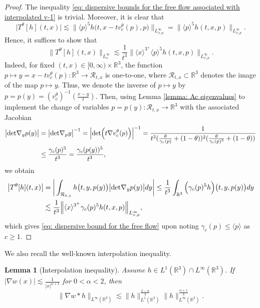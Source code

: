 \documentclass[reqno, 11pt, letterpaper]{amsart}
\newtheorem{lemma}[theorem]{Lemma}
\theoremstyle{remark}
\numberwithin{equation}{section}
\numberwithin{theorem}{section}
\numberwithin{table}{section}
\numberwithin{figure}{section}
\begin{document}
\begin{proof}
The inequality \eqref{eq: dispersive bounds for the free flow associated with interpolated v-1} is trivial. 
Moreover, it is clear that 
$$
\big|T^\theta[h](t,x)\big|\lesssim 
\Big\|\langle p\rangle^5 h \Big(t, x-tv_c^\theta(p),p\Big)\Big\|_{L_{x,p}^\infty}=\big\|\langle p\rangle^5 h(t, x,p)\big\|_{L_{x,p}^\infty}.$$
Hence, it suffices to show that 
\begin{equation}\label{eq: dispersive bound for the free flow}
\big\|T^\theta[h](t,x)\big\|_{L_x^\infty}\lesssim \frac{1}{t^3}\big\|\langle x\rangle^{3^+}\langle p\rangle^5h(t,x,p)\big\|_{L_{x,p}^\infty}.
\end{equation}
Indeed, for fixed $(t,x)\in [0,\infty)\times\mathbb{R}^3$, the function $p\mapsto y=x-tv_c^\theta(p):\mathbb{R}^3\to \mathcal{R}_{t,x}$ is one-to-one, where $\mathcal{R}_{t,x}\subset \mathbb{R}^3$ denotes the image of the map $p\mapsto y$. Thus, we denote the inverse of $p\mapsto y$ by $p=p(y)=(v_c^\theta)^{-1}(\frac{x-y}{t})$. Then, using Lemma \ref{lemma: Ac eigenvalues} to implement the change of variables $p=p(y): \mathcal{R}_{t,x}\to\mathbb{R}^3$ with the associated Jacobian 
$$\begin{aligned}
\big|\textup{det}\nabla_yp(y)\big|&=\big|\textup{det}\nabla_p y\big|^{-1}= \Big|\textup{det}\Big(t\nabla v_c^\theta(p)\Big)\Big|^{-1}=\frac{1}{t^3(\frac{\theta}{\gamma_c(p)}+(1-\theta))^2(\frac{\theta}{\gamma_c(p)^3}+(1-\theta))}\\
&\leq \frac{\gamma_c(p)^5}{t^3}=\frac{\gamma_c(p(y))^5}{t^3},
\end{aligned}$$
we obtain
$$\begin{aligned}
\big|T^\theta[h](t,x)\big| 
&=\bigg|\int_{\mathcal{R}_{t,x}} h \big(t,y, p(y)\big) \big|\textup{det}\nabla_y p(y)\big| dy\bigg|\leq\frac{1}{t^3}\int_{\mathbb{R}^3} \Big(\gamma_c(p)^5 h\Big)\big(t,y, p(y) \big) dy\\
&\lesssim\frac{1}{t^3}\Big\|\langle x\rangle^{3^+}\gamma_c(p)^5 h(t,x,p)\Big\|_{L_{x,p}^\infty},
\end{aligned}$$
which gives \eqref{eq: dispersive bound for the free flow}
upon noting $\gamma_c(p) \leq \langle p \rangle$ as $c \geq 1$.
\end{proof}

We also recall the well-known interpolation inequality.

\begin{lemma}[Interpolation inequality]
\label{lemma: interpolation inequality}
Assume $h \in L^1(\mathbb{R}^3) \cap L^\infty(\mathbb{R}^3)$. If $|\nabla w(x)|\lesssim\frac{1}{|x|^{\alpha+1}}$ for $0<\alpha<2$, then 
$$\|\nabla w*h\|_{L^\infty(\mathbb{R}^3)}\lesssim \|h\|_{L^1(\mathbb{R}^3)}^{\frac{2-\alpha}{3}}\|h\|_{L^\infty(\mathbb{R}^3)}^{\frac{\alpha+1}{3}}.$$
\end{lemma}
\end{document}
